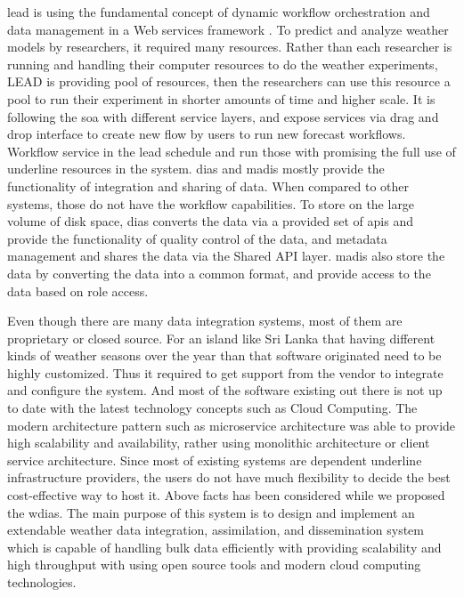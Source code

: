 \documentclass[conference]{IEEEtran}
\begin{document}
\acrfull{lead} is using the fundamental concept of  dynamic workflow orchestration and
data management in a Web services framework \cite{Droegemeier2005Service-OrientedWeather}. To predict and analyze weather models
by researchers, it required many resources. Rather than each researcher is running and
handling their computer resources to do the weather experiments, LEAD is providing pool of resources, then the researchers can use this resource a pool to run their
experiment in shorter amounts of time and higher scale. It is following the \acrfull{soa} with different service layers, and expose services via drag and drop interface to create new flow by users to run new forecast workflows. Workflow service in the \acrshort{lead} schedule and run those with promising the full use of underline resources in the system. \acrfull{dias} and \acrfull{madis} mostly provide the functionality of integration and sharing of data. When compared to other systems, those do not have the workflow capabilities. To store on the large volume of disk space, \acrshort{dias} converts the data via a provided set of \acrshort{api}s and provide the functionality of quality control of the data, and metadata management and  shares the data via the Shared API layer. \acrshort{madis} also store the data by converting the data into a common format, and provide access to the data based on role access.

Even though there are many data integration systems, most of them are proprietary or closed source.
For an island like Sri Lanka that having different kinds of weather seasons
over the year than that software originated need to be highly customized.
Thus it required to get support from the vendor to integrate and configure the
system.
And most of the software existing out there is not up to date with the latest
technology concepts such as Cloud Computing.
The modern architecture pattern such as microservice architecture was able to provide high scalability and availability, rather using monolithic architecture or client service architecture.
Since most of existing systems are dependent underline infrastructure providers, the users do not have much flexibility to decide the best cost-effective way to host it. Above facts has been considered while we proposed the \acrfull{wdias}. The main purpose of this system is to design and implement an extendable weather data integration, assimilation, and dissemination system which is capable of handling bulk data efficiently with providing scalability and high throughput with using open source tools and modern cloud computing technologies.
\end{document}
